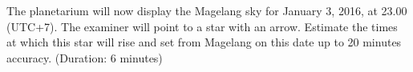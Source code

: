 The planetarium will now display the Magelang sky for January 3, 2016, at
23.00 (UTC+7). The examiner will point to a star with an arrow. Estimate the
times at which this star will rise and set from Magelang on this date up to
20 minutes accuracy. (Duration: 6 minutes)
